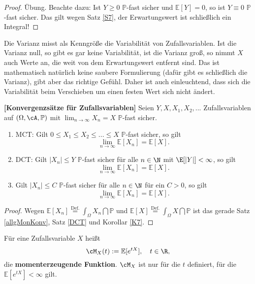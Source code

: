 \begin{proof}
	Übung. Beachte dazu: Ist $Y \geq 0$ $\mathbb{P}$-fast sicher und $ \mathbb{E}[Y] = 0$, so ist $ Y \equiv 0$ $\mathbb P$-fast sicher. Das gilt wegen Satz \ref{S7}, der Erwartungswert ist schlie\ss lich ein Integral!
\end{proof}
Die Varianz misst als Kenngr\"o\ss e die Variabilit\"at von Zufallsvariablen. Ist die Varianz null, so gibt es gar keine Variabilit\"at, ist die Varianz gro\ss, so nimmt $X$ auch Werte an, die weit von dem Erwartungswert entfernt sind. Das ist mathematisch nat\"urlich keine saubere Formulierung (daf\"ur gibt es schlie\ss lich die Varianz), gibt aber das richtige Gef\"uhl. Daher ist auch einleuchtend, dass sich die Variabilit\"at beim Verschieben um einen festen Wert sich nicht \"andert.



\begin{satz}
 \textbf{[Konvergenzsätze für Zufallsvariablen]}
	Seien $Y,X,X_1,X_2,...$ Zufallsvariablen auf $(\Omega, \cA, \mathbb{P})$ mit $\lim_{n\to\infty} X_n=X$ $\mathbb{P}$-fast sicher.
	\begin{enumerate}[label=(\roman*)]
		\item MCT: Gilt $0 \leq X_1\leq X_2\leq ...\leq X$ $\mathbb{P}$-fast sicher, so gilt 
		\[ \lim\limits_{n \to \infty} \mathbb{E}[X_n] = \mathbb{E}[X]. \]
				\item DCT: Gilt $|X_n| \leq Y$ $\mathbb{P}$-fast sicher für alle $n \in \N$ mit $\E[|Y|]<\infty$, so gilt
		\[ \lim\limits_{n \to \infty} \mathbb{E}[X_n] = \mathbb{E}[X]. \]
		\item Gilt $|X_n| \leq C$ $\mathbb{P}$-fast sicher für alle $n \in \N$ f\"ur ein $C>0$, so gilt
		\[ \lim\limits_{n \to \infty} \mathbb{E}[X_n] = \mathbb{E}[X]. \]
	\end{enumerate}
\end{satz}

\begin{proof}
	Wegen $\mathbb{E}[X_n] \overset{\text{Def.}}{=} \int_{\Omega} X_n \dint \mathbb{P}$ und $\mathbb{E}[X] \overset{\text{Def.}}{=} \int_{\Omega} X \dint \mathbb{P}$ ist das gerade Satz \ref{allgMonKonv}, Satz \ref{DCT} und Korollar \ref{K7}. 
\end{proof}

\begin{deff}
	F\"ur eine Zufallsvariable $X$ heißt $$\cM_X(t) := \mathbb{E}[e^{tX}], \quad t\in\R,$$ die \textbf{momenterzeugende Funktion}. $\cM_X$ ist nur für die $t$ definiert, für die $\mathbb{E}[e^{tX}] < \infty$ gilt.
\end{deff}

